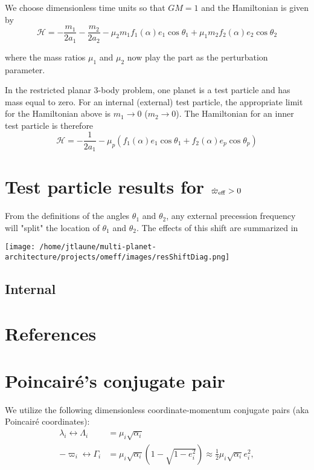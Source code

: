 \documentclass[11pt]{article}
\begin{document}
We choose dimensionless time units so that \(GM=1\) and
the Hamiltonian is given by
\begin{equation}
  \mathcal{H} = -\frac{m_1}{2a_1} -\frac{m_2}{2a_2} - \mu_2 m_1 f_1(\alpha) e_1 \cos\theta_1 + \mu_1 m_2 f_2(\alpha) e_2\cos\theta_2
\end{equation}

\noindent
where the mass ratios \(\mu_1\) and \(\mu_2\) now play the part as the perturbation parameter.

In the restricted planar 3-body problem, one planet is a test particle and has mass equal to zero.
For an internal (external) test particle,
the appropriate limit for the Hamiltonian above is \(m_1\to0\) (\(m_2\to0\)).
The Hamiltonian for an inner test particle is therefore
\begin{equation}
  \mathcal{H} = -\frac{1}{2a_1} - \mu_p( f_1(\alpha) e_1 \cos\theta_1 + f_2(\alpha) e_p\cos\theta_p)
\end{equation}

\noindent


\section{Test particle results for \(\dot\varpi_{\rm eff}>0\)}
\label{sec:org94f9ac7}
From the definitions of the angles \(\theta_1\) and \(\theta_2\),
any external precession frequency will "split" the location
of \(\theta_1\) and \(\theta_2\). The effects of this
shift are summarized in 

\begin{center}
\texttt{[image: /home/jtlaune/multi-planet-architecture/projects/omeff/images/resShiftDiag.png]}
\end{center}

\subsection{Internal}
\label{sec:orgd9fc98c}

\section{References}
\label{sec:org332b607}



\clearpage
\onecolumn
\appendix

\section{Poincair\'e's conjugate pair}
\label{sec:orga556740}
We utilize the following dimensionless coordinate-momentum conjugate
pairs (aka Poincair\'e coordinates):
\begin{align}
  \lambda_i \longleftrightarrow\Lambda_i &= \mu_i\sqrt{\alpha_i} \\
  -\varpi_i \longleftrightarrow\Gamma_i &= \mu_i\sqrt{\alpha_i}(1-\sqrt{1-e_i^2}) \approx \frac12\mu_i\sqrt{\alpha_i}e_i^2,
\end{align}
\end{document}
